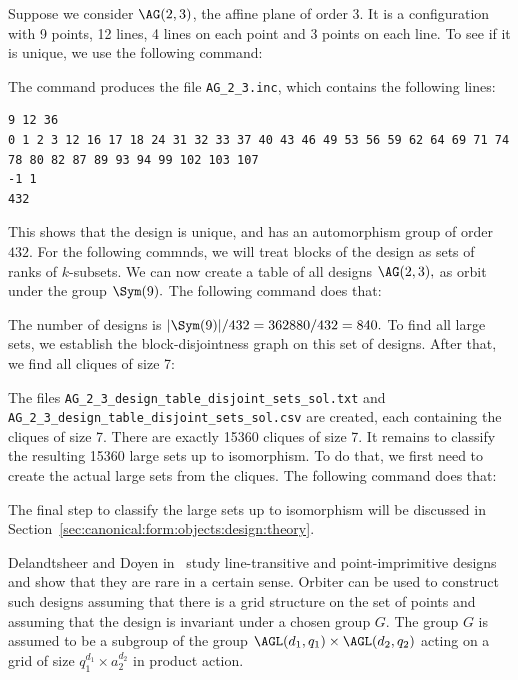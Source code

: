 Suppose we consider $\AG(2,3)$, the affine plane of order 3. 
It is a configuration with 9 points, 12 lines, 4 lines on each point and 3 points on each line.
To see if it is unique, we use the following command:
{\tt

}
The command produces the file \verb'AG_2_3.inc', which contains the following lines:
{\scriptsize
\begin{verbatim}
9 12 36
0 1 2 3 12 16 17 18 24 31 32 33 37 40 43 46 49 53 56 59 62 64 69 71 74 78 80 82 87 89 93 94 99 102 103 107 
-1 1
432
\end{verbatim}}
This shows that the design is unique, and has an automorphism group of order $432$.
For the following commnds, we will treat blocks of the design as sets of ranks of $k$-subsets. 
We can now create a table of all designs $\AG(2,3),$ as orbit under the group $\Sym(9).$
The following command does that:
{\tt

}
{\tt

}
The number of designs is $|\Sym(9)|/432 = 362880/432 = 840.$
To find all large sets, we establish the block-disjointness graph 
on this set of designs. After that, we find all cliques of size 7:
{\tt

}
The files \verb'AG_2_3_design_table_disjoint_sets_sol.txt' and \verb'AG_2_3_design_table_disjoint_sets_sol.csv' are created, each containing the cliques of size 7. 
There are exactly 15360 cliques of size 7.
It remains to classify the resulting 15360 large sets up to isomorphism. 
To do that, we first need to create the actual large sets from the cliques.
The following command does that:
{\tt

}
The final step to classify the large sets up to isomorphism 
will be discussed in Section~\ref{sec:canonical:form:objects:design:theory}.



Delandtsheer and Doyen in~\cite{DelandtsheerDoyen1989} study 
line-transitive and point-imprimitive designs 
and show that they are rare in a certain sense.
Orbiter can be used to construct such designs 
assuming that there is a grid structure on the set 
of points and assuming that the design is invariant under a chosen group $G$. 
The group $G$ is assumed to be a subgroup of the group 
$\AGL(d_1,q_1) \times \AGL(d_2,q_2)$ acting on a grid of size 
$q_1^{d_1} \times a_2^{d_2}$ in product action.

\bigskip

